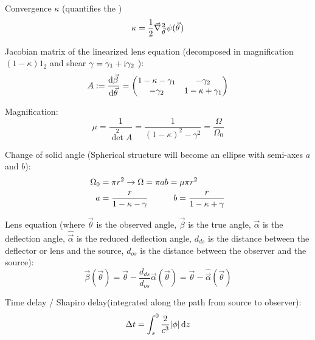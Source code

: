 			\noindent
			Convergence $\kappa$ (quantifies the )
			\begin{equation}
				\kappa = \frac{1}{2} \Nabla_{\vec{\theta}}^2 \psi(\vec{\theta})
			\end{equation}

			\noindent
			Jacobian matrix of the linearized lens equation (decomposed in magnification $(1-\kappa) 1_{2}$ and shear $\gamma =\gamma_1 + \mathrm{i} \gamma_2$ ):
			\begin{equation}
				A := \dv{\vec{\beta}}{\vec{\theta}} = \mqty(
				1 - \kappa - \gamma_1 & -\gamma_2 \\
				-\gamma_2 & 1 - \kappa + \gamma_1)
			\end{equation}

			\noindent
			Magnification:
			\begin{equation}
				\mu  =\frac{1}{\det^2 A} = \frac{1}{(1-\kappa)^2 - \gamma^2} = \frac{\Omega}{\Omega_0}
			\end{equation}

			\noindent
			Change of solid angle (Spherical structure will become an ellipse with semi-axes $a$ and $b$):
			\begin{equation}
				\begin{aligned}
					\Omega_0 &= \pi r^2 \to \Omega = \pi a b = \mu \pi r^2 \\
					a &= \frac{r}{1-\kappa-\gamma} \hspace{30pt} b = \frac{r}{1-\kappa+\gamma}
				\end{aligned}
			\end{equation}

			\noindent
			Lens equation (where $\vec{\theta}$ is the observed angle, $\vec{\beta}$ is the true angle, $\vec{\alpha}$ is the deflection angle, $\hat{\vec{\alpha}}$ is the reduced deflection angle, $d_{ds}$ is the distance between the deflector or lens and the source, $d_{os}$ is the distance between the observer and the source):
			\begin{equation}
				\vec{\beta}(\vec{\theta})
				= \vec{\theta} - \frac{d_{ds}}{d_{os}} \vec{\alpha}(\vec{\theta})
				= \vec{\theta} - \hat{\vec{\alpha}}(\vec{\theta})
			\end{equation}

			\noindent
			Time delay / Shapiro delay(integrated along the path from source to observer):
			\begin{equation}
				\Delta t = \int_{s}^{0} \frac{2}{c^3} \abs{\phi} \, \dd z
			\end{equation}